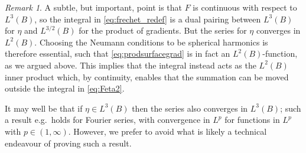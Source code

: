 \documentclass[reqno]{amsart}
\numberwithin{equation}{section}
\numberwithin{figure}{section}
\numberwithin{table}{section}
\theoremstyle{plain}
\theoremstyle{definition}
\theoremstyle{remark}
\newtheorem{remark}[theorem]{Remark}
\begin{document}
\begin{remark}
    A subtle, but important, point is that $F$ is continuous with respect to $L^3(B)$, so the integral in \eqref{eq:frechet_redef} is a dual pairing between $L^3(B)$ for $\eta$ and $L^{3/2}(B)$ for the product of gradients. But the series for $\eta$ converges in $L^2(B)$. Choosing the Neumann conditions to be spherical harmonics is therefore essential, such that \eqref{eq:prodsurfacegrad} is in fact an $L^2(B)$-function, as we argued above. This implies that the integral instead acts as the $L^2(B)$ inner product which, by continuity, enables that the summation can be moved outside the integral in \eqref{eq:Feta2}. 
    
    It may well be that if $\eta\in L^3(B)$ then the series also converges in $L^3(B)$; such a result e.g.\ holds for Fourier series, with convergence in $L^p$ for functions in $L^p$ with $p\in(1,\infty)$. However, we prefer to avoid what is likely a technical endeavour of proving such a result.
\end{remark}
\end{document}
